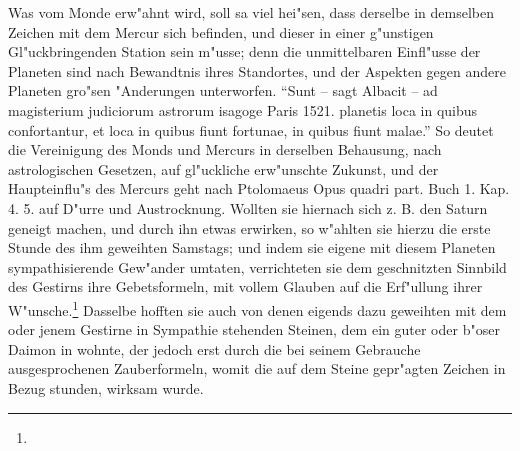 \documentclass[a4paper, 11pt, oneside, polutonikogreek, german]{article}
\begin{document}
{{\hspace*{0.5cm} Was vom Monde erw"ahnt wird, soll sa viel hei"sen, dass derselbe in demselben Zeichen mit dem Mercur sich befinden, und dieser in einer g"unstigen Gl"uckbringenden Station sein m"usse; denn die unmittelbaren Einfl"usse der Planeten sind nach Bewandtnis ihres Standortes, und der Aspekten gegen andere Planeten gro"sen "Anderungen unterworfen. "`Sunt -- sagt Albacit -- ad magisterium judiciorum astrorum isagoge Paris 1521. planetis loca in quibus confortantur, et loca in quibus fiunt fortunae, in quibus fiunt malae."' So deutet die Vereinigung des Monds und Mercurs in derselben Behausung, nach astrologischen Gesetzen, auf gl"uckliche erw"unschte Zukunst, und der Haupteinflu"s des Mercurs geht nach Ptolomaeus Opus quadri part. Buch 1. Kap. 4. 5. auf D"urre und Austrocknung.}} Wollten sie hiernach sich z. B. den Saturn geneigt machen, und durch ihn etwas erwirken, so w"ahlten sie hierzu die erste Stunde des ihm geweihten Samstags; und indem sie eigene mit diesem Planeten sympathisierende Gew"ander umtaten, verrichteten sie dem geschnitzten Sinnbild des Gestirns ihre Gebetsformeln, mit vollem Glauben auf die Erf"ullung ihrer W"unsche.\footnote{} Dasselbe hofften sie auch von denen eigends dazu geweihten mit dem oder jenem Gestirne in Sympathie stehenden Steinen, dem ein guter oder b"oser Daimon in wohnte, der jedoch erst durch die bei seinem Gebrauche ausgesprochenen Zauberformeln, womit die auf dem Steine gepr"agten Zeichen in Bezug stunden, wirksam wurde.
\end{document}
